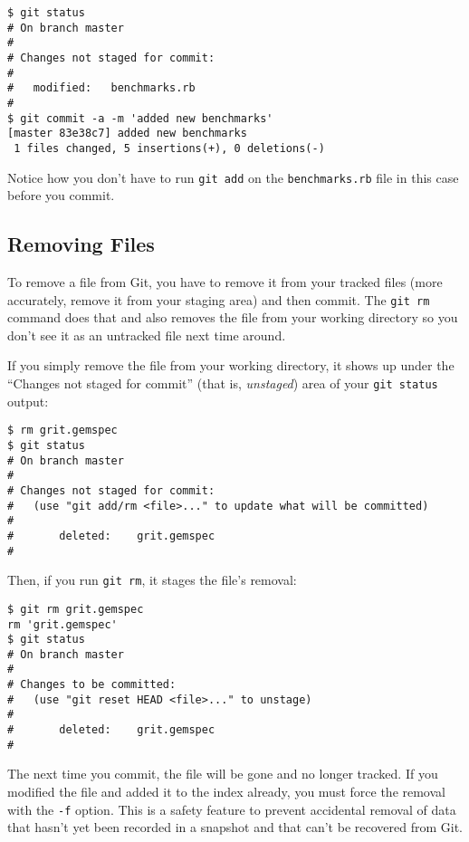 \documentclass[a4paper]{book}
\begin{document}
\begin{shaded}\begin{verbatim}
$ git status
# On branch master
#
# Changes not staged for commit:
#
#	modified:   benchmarks.rb
#
$ git commit -a -m 'added new benchmarks'
[master 83e38c7] added new benchmarks
 1 files changed, 5 insertions(+), 0 deletions(-)
\end{verbatim}\end{shaded}

Notice how you don't have to run \texttt{git add} on the \texttt{benchmarks.rb} file in this case before you commit.

\subsection{Removing Files}

To remove a file from Git, you have to remove it from your tracked files (more accurately, remove it from your staging area) and then commit. The \texttt{git rm} command does that and also removes the file from your working directory so you don't see it as an untracked file next time around.

If you simply remove the file from your working directory, it shows up under the “Changes not staged for commit” (that is, \emph{unstaged}) area of your \texttt{git status} output:

\begin{shaded}\begin{verbatim}
$ rm grit.gemspec
$ git status
# On branch master
#
# Changes not staged for commit:
#   (use "git add/rm <file>..." to update what will be committed)
#
#       deleted:    grit.gemspec
#
\end{verbatim}\end{shaded}

Then, if you run \texttt{git rm}, it stages the file's removal:

\begin{shaded}\begin{verbatim}
$ git rm grit.gemspec
rm 'grit.gemspec'
$ git status
# On branch master
#
# Changes to be committed:
#   (use "git reset HEAD <file>..." to unstage)
#
#       deleted:    grit.gemspec
#
\end{verbatim}\end{shaded}

The next time you commit, the file will be gone and no longer tracked. If you modified the file and added it to the index already, you must force the removal with the \texttt{-f} option. This is a safety feature to prevent accidental removal of data that hasn't yet been recorded in a snapshot and that can't be recovered from Git.
\end{document}
